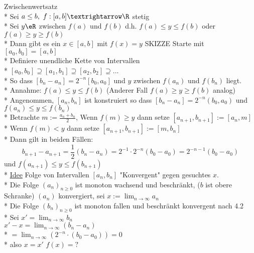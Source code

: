 %
\wdh
Zwischenwertsatz\\*
Sei $a\leq b,\ f:[a,b]→\R$ stetig\\*
Sei $y\eR$ zwischen $f(a)$ und $f(b)$ d.h. $f(a)\leq y\leq f(b)$ oder $f(a)\geq y\geq f(b)$\\*
Dann gibt es ein $x\in[a,b]$ mit $f(x)=y$ SKIZZE
Starte mit $[a_0,b_0]=[a,b]$\\*
Definiere unendliche Kette von Intervallen\\*
$[a_0,b_0]\supseteq [a_1,b_1]\supseteq [a_2,b_2]\supseteq …$\\*
So dass $[b_n-a_n]=2^{-n}[b_0,a_0]$ und $y$ zwischen $f(a_n)$ und $f(b_n)$ liegt.\\*
Annahme: $f(a)\leq y\leq f(b)$ (Anderer Fall $f(a)\geq y\geq f(b)$ analog)\\*
Angenommen, $[a_n,b_n]$ ist konstruiert so dass $[b_n-a_n]=2^{-n}(b_0,a_0)$ und $f(a_n)\leq y\leq f(b_n)$\\*
Betrachte $m:=\frac{a_n+b_n}{2}$, Wenn $f(m)\geq y$ dann setze $[a_{n+1},b_{n+1}]:=[a_n,m]$\\*
Wenn $f(m)<y$ dann setze $[a_{n+1},b_{n+1}]:=[m,b_n]$\\*
Dann gilt in beiden Fällen:
$$b_{n+1}-a_{n+1}=\frac{1}{2}(b_n-a_n)=2^{-1}·2^{-n}(b_0-a_0)=2^{-n-1}(b_0-a_0)$$
und $f(a_{n+1})\leq y\leq f(b_{n+1})$\\*
%
\ul{Idee} Folge von Intervallen $[a_n, b_n]$ "Konvergent" gegen gesuchtes $x$.\\*
	Die Folge $(a_n)_{n \geq 0}$ ist monoton wachsend und beschränkt, ($b$ ist obere Schranke) \Rarr $(a_n)$ konvergiert, sei $x:=\lim_{n \to \infty} a_n$\\*
	Die Folge $(b_n)_{n \geq 0}$ ist monoton fallen und beschränkt \Rarr konvergent nach 4.2\\*
	Sei $x' = \lim_{n \to \infty} b_n$\\
	$x' - x = \lim_{n \to \infty} (b_n - a_n)$\\*
	$= \lim_{n \to \infty} (2^{-n} \cdot (b_0 - a_0)) = 0$\\*
	also $x = x'$ $f(x) = ?$\\
